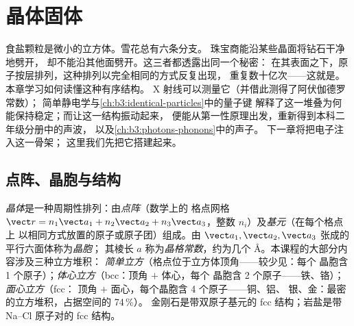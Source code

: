 \chapter{晶体固体}\label{ch:b3:crystalline-solids}


食盐颗粒是微小的立方体。雪花总有六条分支。
珠宝商能沿某些晶面将钻石干净地劈开，
却不能沿其他面劈开。这三者都透露出同一个秘密：
在其表面之下，原子按层排列，这种排列以完全相同的方式反复出现，
重复数十亿次——这就是\emph{}。本章学习如何读懂这种有序结构。
X 射线可以测量它（并借此测得了阿伏伽德罗常数）；
简单静电学与\cref{ch:b3:identical-particles}中的量子键
解释了这一堆叠为何能保持稳定；而让这一结构振动起来，
便能从第一性原理出发，重新得到本科二年级分册中的声波，
以及\cref{ch:b3:photons-phonons}中的声子。
下一章将把电子注入这一骨架；
这里我们先把它搭建起来。

\section{点阵、晶胞与结构}

\begin{definition}[点阵与基元]\label{def:b3:crystalline-solids:lattice}
\emph{晶体}是一种周期性排列：由\emph{点阵}（数学上的
格点网格 $\vect r = n_1\vect a_1 + n_2\vect a_2
+ n_3\vect a_3$，整数 $n_i$）及\emph{基元}（在每个格点上
以相同方式放置的原子或原子团）组成。由
$\vect a_1, \vect a_2, \vect a_3$ 张成的平行六面体称为\emph{晶胞}；
其棱长 $a$ 称为\emph{晶格常数}，约为几个
\unit{\angstrom}。本课程的大部分内容涉及三种立方堆积：
\emph{简单立方}（格点位于立方体顶角——较少见：每个
晶胞含 1 个原子）；\emph{体心立方}（bcc：顶角 $+$ 体心，每个
晶胞含 2 个原子——铁、铬）；\emph{面心立方}（fcc：
顶角 $+$ 面心，每个晶胞含 4 个原子——铜、铝、
银、金：最密的立方堆积，占据空间的 74\,\%）。
金刚石是带双原子基元的 fcc 结构；岩盐是带
Na--Cl 原子对的 fcc 结构。
\end{definition}


